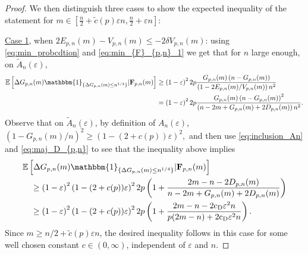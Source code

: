 \documentclass[a4, 11pt]{article}
\numberwithin{equation}{section}
\theoremstyle{plain}
\theoremstyle{definition}
\theoremstyle{remark}
\begin{document}
\begin{proof}
We then distinguish three cases to show the expected inequality of the statement for \linebreak $m\in\left[\frac{n}{2}+\tilde{c}(p)\varepsilon n,\frac{n}{2}+\varepsilon n\right]$:	

{\underline{Case 1}, when}  $2E_{p,n}(m)-V_{p,n}(m)\leq -2\delta V_{p,n}(m)$: using \eqref{eq:min_probcdtion} and \eqref{eq:min_{F}_{p,n}_1} we get that for $n$ large enough, on $\tilde{A}_n(\varepsilon)$,
		\begin{align*}
			\mathbb{E}\left[\Delta G_{p,n}(m)\mathbbm{1}_{\{\Delta G_{p,n}(m)\leq n^{1/4}\}}| \mathbf{F}_{p,n}(m)\right]
			&\geq \left(1-\varepsilon\right)^22p\frac{G_{p,n}(m)\left(n-G_{p,n}(m)\right)}{\left(1-2E_{p,n}(m)/V_{p,n}(m)\right)n^2}\\
			&=\left(1-\varepsilon\right)^22p\frac{G_{p,n}(m)\left(n-G_{p,n}(m)\right)^2}{\left(n-2m+G_{p,n}(m)+2D_{p,n}(m)\right)n^2}.
		\end{align*}
Observe that on $\tilde{A}_n(\varepsilon)$, by definition of $A_n(\varepsilon)$,
		$\left(1-G_{p,n}(m)/n\right)^2\geq \left(1-(2+c(p))\varepsilon\right)^2,$ 
		and then use  \eqref{eq:inclusion_An} and \eqref{eq:maj_D_{p,n}} to see that the inequality above implies
		\begin{align*}
			& \mathbb{E}\left[\Delta G_{p,n}(m)\mathbbm{1}_{\{\Delta G_{p,n}(m)\leq n^{1/4}\}}| \mathbf{F}_{p,n}(m)\right] \\
			& \quad \geq \left(1-\varepsilon\right)^2\left(1-(2+c(p))\varepsilon\right)^2 2p\left(1+\frac{2m-n-2D_{p,n}(m)}{n-2m+G_{p,n}(m)+2D_{p,n}(m)}\right) \\
		 	& \quad \geq \left(1-\varepsilon\right)^2\left(1-(2+c(p))\varepsilon\right)^2 2p\left(1+\frac{2m-n-2\mathrm{c_D}\varepsilon^2 n}{p(2m-n)+2\mathrm{c_D}\varepsilon^2n}\right).
		\end{align*}
		Since $m\geq n/2+\tilde{c}(p)\varepsilon n$, the desired inequality follows in this case for some well chosen constant ${c} \in (0,\infty)$, independent of $\varepsilon$ and $n$.


\end{proof}
\end{document}
